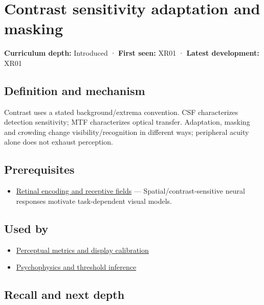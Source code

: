 \hypertarget{appendix-b3aa9e8e01ad}{}
\section{Contrast sensitivity adaptation and masking}\label{appendix-b3aa9e8e01ad-contrast-sensitivity-adaptation-and-masking}

\textbf{Curriculum depth:} Introduced · \textbf{First seen:} XR01 · \textbf{Latest development:} XR01

\subsection{Definition and mechanism}\label{appendix-b3aa9e8e01ad-definition-and-mechanism}

Contrast uses a stated background/extrema convention. CSF characterizes detection sensitivity; MTF characterizes optical transfer. Adaptation, masking and crowding change visibility/recognition in different ways; peripheral acuity alone does not exhaust perception.

\subsection{Prerequisites}\label{appendix-b3aa9e8e01ad-prerequisites}

\begin{itemize}
\tightlist
\item
  \hyperref[appendix-7281c15ac44a]{Retinal encoding and receptive fields} --- Spatial/contrast-sensitive neural responses motivate task-dependent visual models.
\end{itemize}

\subsection{Used by}\label{appendix-b3aa9e8e01ad-used-by}

\begin{itemize}
\tightlist
\item
  \hyperref[appendix-b2c1846508bf]{Perceptual metrics and display calibration}
\item
  \hyperref[appendix-1759f03e8ce7]{Psychophysics and threshold inference}
\end{itemize}

\subsection{Recall and next depth}\label{appendix-b3aa9e8e01ad-recall-and-next-depth}

